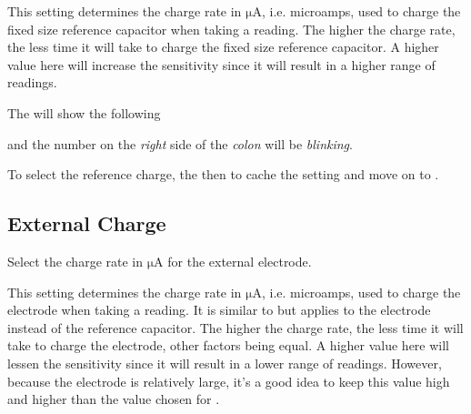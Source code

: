 This setting determines the charge rate in $\mathrm{\mu A}$, i.e. microamps,
used to charge the fixed size reference capacitor when taking a reading.
The higher the charge rate, the less time it will take to charge the fixed size
reference capacitor.  A higher value here will increase the sensitivity since
it will result in a higher range of readings.

\par\medskip

The  will show the following


and the number on the \textit{right} side of the \textit{colon} will be
\textit{blinking}.

\par\medskip

To select the reference charge,  the  then  to cache the
setting and move on to .


\subsection{External Charge} 

Select the charge rate in $\mathrm{\mu A}$ for the external electrode.

\par\medskip

This setting determines the charge rate in $\mathrm{\mu A}$, i.e. microamps,
used to charge the electrode when taking a reading.  It is similar to 
but applies to the electrode instead of the reference capacitor.  The higher
the charge rate, the less time it will take to charge the electrode, other
factors being equal.  A higher value here will lessen the sensitivity since it
will result in a lower range of readings.  However, because the electrode is
relatively large, it's a good idea to keep this value high and higher than the
value chosen for .

\par\medskip

